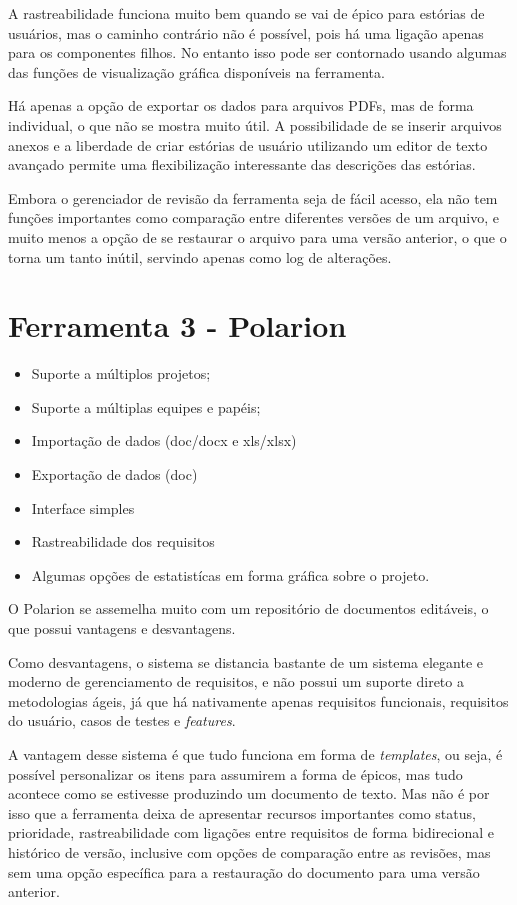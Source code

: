 A rastreabilidade funciona muito bem quando se vai de épico  para estórias de usuários, mas o caminho contrário não é possível, pois há uma ligação apenas para os componentes filhos. No entanto isso pode ser contornado usando algumas das funções de visualização gráfica disponíveis na ferramenta.

Há apenas a opção de exportar os dados para arquivos PDFs, mas de forma individual, o que não se mostra muito útil. A possibilidade de se inserir arquivos anexos e a liberdade de criar estórias de usuário utilizando um editor de texto avançado permite uma flexibilização interessante das descrições das estórias.

Embora o gerenciador de revisão da ferramenta seja de fácil acesso, ela não tem funções importantes como comparação entre diferentes versões de um arquivo, e muito menos a opção de se restaurar o arquivo para uma versão anterior, o que o torna um tanto inútil, servindo apenas como log de alterações.

\section{Ferramenta 3 - Polarion}
\begin{itemize}
  \item Suporte a múltiplos projetos;
  \item Suporte a múltiplas equipes e papéis;
  \item Importação de dados (doc/docx e xls/xlsx)
  \item Exportação de dados (doc)
  \item Interface simples
  \item Rastreabilidade dos requisitos
  \item Algumas opções de estatistícas em forma gráfica sobre o projeto.
\end{itemize}

O Polarion se assemelha muito com um repositório de documentos editáveis, o que possui vantagens e desvantagens.

Como desvantagens, o sistema se distancia bastante de um sistema elegante e moderno de gerenciamento de requisitos, e não possui um suporte direto a metodologias ágeis, já que há nativamente apenas requisitos funcionais, requisitos do usuário,
casos de testes e \emph{features}.

A vantagem desse sistema é que tudo funciona em forma de \emph{templates}, ou seja, é possível personalizar os itens para assumirem a forma de épicos, mas tudo acontece como se estivesse produzindo um documento de texto. Mas não é por isso que a ferramenta deixa de apresentar recursos importantes como status, prioridade, rastreabilidade com ligações entre requisitos de forma bidirecional e histórico de versão, inclusive com opções de comparação entre as revisões, mas sem uma opção específica para a restauração do documento para uma versão anterior.

